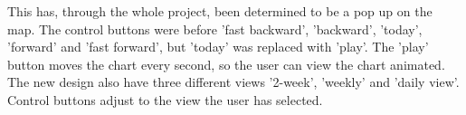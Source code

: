 This has, through the whole project, been determined to be a pop up on the map.
The control buttons were before 'fast backward', 'backward', 'today', 'forward' and 'fast forward', but 'today' was replaced with 'play'. The 'play' button moves the chart every second, so the user can view the chart animated.\\
The new design also have three different views '2-week', 'weekly' and 'daily view'. Control buttons adjust to the view the user has selected.

